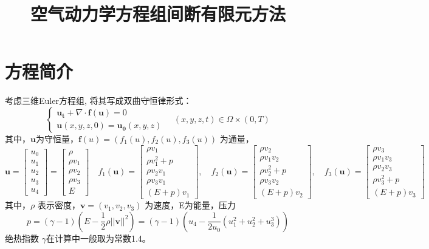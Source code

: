 \documentclass[a4paper, 12pt, UTF8]{ctexart}
\title{空气动力学方程组间断有限元方法}
\date{} %
\newcommand{\bs}[1]{\boldsymbol{#1}}
\begin{document}
\maketitle


\section{方程简介}
考虑三维Euler方程组, 将其写成双曲守恒律形式：
\begin{equation}
 \begin{cases}
    	\bs {u_{t}}+\nabla \cdot \bs f(\bs u)=0 \\
    	\bs u(x, y, z, 0)=\bs{u_{0}}(x, y, z)
    \end{cases} \quad (x, y, z, t)  \in \Omega \times(0, T)
\end{equation}
其中，$\bs u$为守恒量，$\bs f(u)=\left(f_{1}(u), f_{2}(u), f_{3}(u)\right)$ 为通量，
\begin{equation}
\bs{u}=\begin{bmatrix}
	u_0\\
	u_{1}\\
	u_{2}\\
	u_{3}\\
	u_4
\end{bmatrix}
=\begin{bmatrix}
	\rho\\
	\rho v_{1}\\
	\rho v_{2}\\
	\rho v_{3}\\
	 E
\end{bmatrix}
\quad f_{1}(\bs{u})=\begin{bmatrix}
	\rho v_{1}\\
	\rho v_{1}^{2}+p\\
	\rho v_{2} v_{1}\\
	\rho v_{3} v_{1}\\
	(E+p) v_{1}
\end{bmatrix},
\quad f_{2}(\bs{u})=\begin{bmatrix}
	 \rho v_{2}\\
	 \rho v_{1} v_{2}\\
	 \rho v_{2}^{2}+p\\
	 \rho v_{3} v_{2}\\
	 (E+p) v_{2}
\end{bmatrix},
\quad f_{3}(\bs{u})=\begin{bmatrix}
	 \rho v_{3}\\
	 \rho v_{1} v_{3}\\
	 \rho v_{2} v_{3}\\
	 \rho v_{3}^{2}+p\\ 
	 (E+p) v_{3}
\end{bmatrix}
\end{equation}
其中，$\rho$ 表示密度，$\bs{v} = (v_{1}, v_{2}, v_{3})$ 为速度，E为能量，压力 
\begin{equation}\label{pressure}
p=(\gamma-1)\left(E-\frac{1}{2} \rho\bs{||v||}^{2}\right)=(\gamma-1)\left(u_4-\frac{1}{2u_0} \left(u_1^{2}+u_{2}^{2}+u_{3}^{3}\right)\right)
\end{equation}
绝热指数 $\gamma$在计算中一般取为常数1.4。
\end{document}
